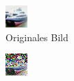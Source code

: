 \begin{figure}[!htb]
\centering
\begin{subfigure}[h]{0.3\textwidth}
  \centering
  \includegraphics[width=\linewidth]{figures/autoencoder_cifar/1.jpg}
  \caption{Originales Bild}
\end{subfigure}
\begin{subfigure}[h]{0.3\textwidth}
  \centering
  \includegraphics[width=\linewidth]{figures/autoencoder_cifar/2.jpg}

\end{subfigure}
\end{figure}
